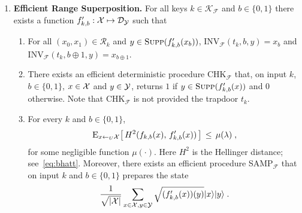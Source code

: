 \begin{definition}
\begin{enumerate}
\item{\textbf{Efficient Range Superposition.}}
For all keys $k\in \mathcal{K}_{\mathcal{F}}$ and $b\in \{0,1\}$ there exists a function $f'_{k,b}:\mathcal{X}\mapsto \mathcal{D}_{\mathcal{Y}}$ such that
\begin{enumerate} 
\item For all $(x_0,x_1)\in \mathcal{R}_k$ and $y\in \textsc{Supp}(f'_{k,b}(x_b))$, INV$_{\mathcal{F}}(t_k,b,y) = x_b$ and INV$_{\mathcal{F}}(t_k,b\oplus 1,y) = x_{b\oplus 1}$. 
\item There exists an efficient deterministic procedure CHK$_{\mathcal{F}}$ that, on input $k$, $b\in \{0,1\}$, $x\in \mathcal{X}$ and $y\in \mathcal{Y}$, returns $1$ if  $y\in \textsc{Supp}(f'_{k,b}(x))$ and $0$ otherwise. Note that CHK$_{\mathcal{F}}$ is not provided the trapdoor $t_k$. 
\item For every $k$ and $b\in\{0,1\}$, 
$$ \textsc{E}_{x\leftarrow_U \mathcal{X}} \big[\,H^2(f_{k,b}(x),\,f'_{k,b}(x))\,\big] \,\leq\, \mu(\lambda)\;,$$
 for some negligible function $\mu(\cdot)$. Here $H^2$ is the Hellinger distance; see~\eqref{eq:bhatt}. Moreover, there exists an efficient procedure  SAMP$_{\mathcal{F}}$ that on input $k$ and $b\in\{0,1\}$ prepares the state
\begin{equation}
    \frac{1}{\sqrt{|\mathcal{X}|}}\sum_{x\in \mathcal{X},y\in \mathcal{Y}}\sqrt{(f'_{k,b}(x))(y)}|x\rangle|y\rangle\;.
\end{equation}


\end{enumerate}



\end{enumerate}
\end{definition}
